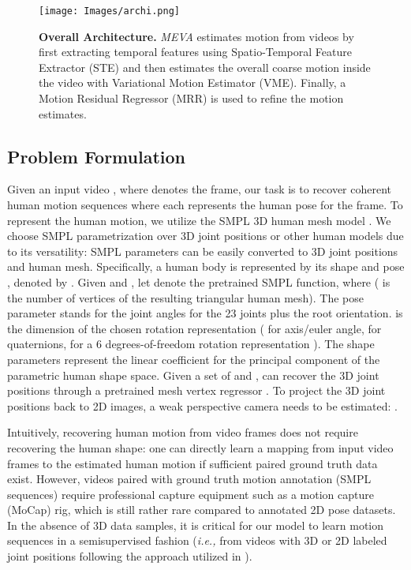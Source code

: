 \documentclass[runningheads]{llncs}
\begin{document}
\begin{figure}[ht]
    \centering
    \texttt{[image: Images/archi.png]}
    \caption{\textbf{Overall Architecture.} \textit{MEVA} estimates motion from videos by first extracting temporal features using Spatio-Temporal Feature Extractor (STE) and then estimates the overall coarse motion inside the video with Variational Motion Estimator (VME). Finally, a Motion Residual Regressor (MRR) is used to refine the motion estimates.}
    \label{fig:archi}
\end{figure}

\subsection{Problem Formulation}
Given an input video  , where  denotes the  frame, our task is to recover coherent human motion sequences  where each  represents the human pose for the  frame. To represent the human motion, we utilize the SMPL 3D human mesh model \cite{SMPL}. We choose SMPL parametrization over 3D joint positions or other human models due to its versatility: SMPL parameters can be easily converted to 3D joint positions and human mesh. Specifically, a human body is represented by its shape  and pose , denoted by . 
Given  and , let  denote the pretrained SMPL function, where  (  is the number of vertices of the resulting triangular human mesh). The pose parameter  stands for the joint angles for the 23 joints plus the root orientation.  is the dimension of the chosen rotation representation ( for axis/euler angle,  for quaternions,  for a 6 degrees-of-freedom  rotation representation \cite{rotrep}). The shape parameters  represent the linear coefficient for the principal component of the parametric human shape space. Given a set of  and ,  can recover the 3D joint positions through a pretrained mesh vertex regressor . To project the 3D joint positions back to 2D images, a weak perspective camera  needs to be estimated: .  


Intuitively, recovering human motion from video frames does not require recovering the human shape: one can directly learn a mapping from input video frames to the estimated human motion if sufficient paired ground truth data exist. However, videos paired with ground truth motion annotation (SMPL sequences) require professional capture equipment such as a motion capture (MoCap) rig, which is still rather rare compared to annotated 2D pose datasets. In the absence of 3D data samples, it is critical for our model to learn motion sequences in a semisupervised fashion (\textit{i.e.,} from videos with  3D or 2D labeled joint positions following the approach utilized in \cite{hmr,hmmr,vibe,spin,1908.07172}). 
\end{document}
